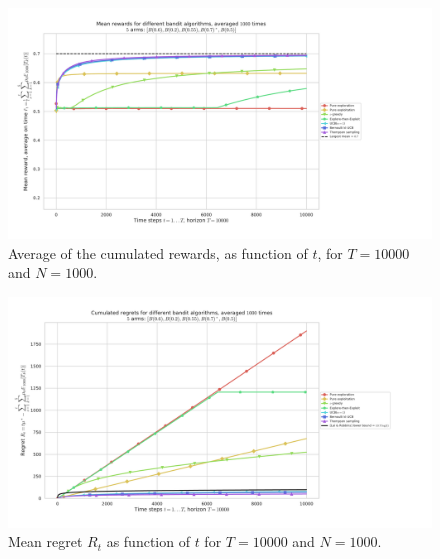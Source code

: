 \begin{figure}[h!]  %
    \includegraphics[width=1.14\linewidth]{SP__K5_T10000_N1000__7_algos/main_MeanRewards____env1-1_2506036032481767447.pdf}
	\caption{Average of the cumulated rewards, as function of $t$, for $T=10000$ and $N=1000$.}
	\label{fig:2:meanRewardsAsFunctionOfTimeForDifferentAlgorithmsT10000N1000}
\end{figure}

\begin{figure}[h!]  %
	\includegraphics[width=1.14\linewidth]{SP__K5_T10000_N1000__7_algos/main____env1-1_2506036032481767447.pdf}
	\caption{Mean regret $R_t$ as function of $t$ for $T=10000$ and $N=1000$.}
	\label{fig:2:meanRegretAsFunctionOfTimeForDifferentAlgorithmsT10000N1000}
\end{figure}



